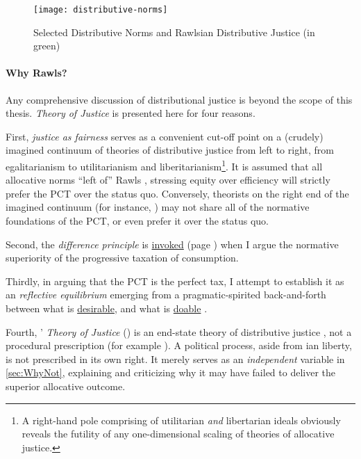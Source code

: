 \begin{figure}[htbp]
	\centering
	\texttt{[image: distributive-norms]}
	\caption[Selected Distributive Norms]{Selected Distributive Norms and Rawlsian Distributive Justice (in green)}
	\label{fig:distributive-norms}
\end{figure}

\paragraph{Why Rawls?}
Any comprehensive discussion of distributional justice is beyond the scope of this thesis.
\citeauthor{Rawls-1971} \emph{Theory of Justice} is presented here for four reasons.

First, \emph{justice as fairness} serves as a convenient cut-off point on a (crudely) imagined continuum of theories of distributive justice from left to right, from egalitarianism to utilitarianism and liberitarianism\footnote{A right-hand pole comprising of utilitarian \emph{and} libertarian ideals obviously reveals the futility of any one-dimensional scaling of theories of allocative justice.}.
%
It is assumed that all allocative norms ``left of'' Rawls \citep[such as][]{Cohen2000}, stressing equity over efficiency will strictly prefer the PCT over the status quo.
Conversely, theorists on the right end of the imagined continuum (for instance, \citealt{Nozick1974}) may not share all of the normative foundations of the PCT, or even prefer it over the status quo.

Second, the \emph{difference principle} is \hyperref[sec:FoundationalBeauty]{invoked} (page \pageref{sec:FoundationalBeauty}) when I argue the normative superiority of the progressive taxation of consumption.

Thirdly, in arguing that the PCT is the perfect tax, I attempt to establish it as an \emph{reflective equilibrium} \citep[49]{Rawls-1971} emerging from a pragmatic-spirited back-and-forth between what is \hyperref[sec:desirability]{desirable}, and what is \hyperref[sec:feasibility]{doable} \citealt[856]{McCaffery2005}.

Fourth, \citeauthor{Rawls-1971}' \emph{Theory of Justice} (\citeyear{Rawls-1971}) is an end-state theory of distributive justice \citep[1007]{Fried1999}, not a procedural prescription (for example \citealt{Dahl-1989-aa}).
A political process, aside from \citeauthor{Rawls-1971}ian liberty, is not prescribed in its own right.
It merely serves as an \emph{independent} variable in \autoref{sec:WhyNot}, explaining and criticizing why it may have failed to deliver the superior allocative outcome.


